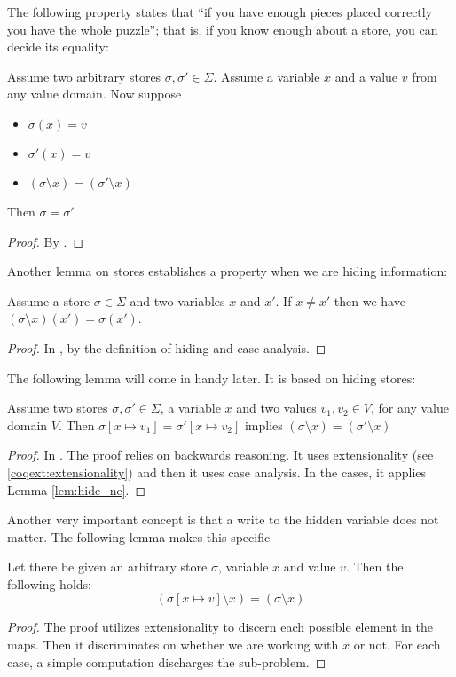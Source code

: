 The following property states that ``if you have enough pieces placed
correctly you have the whole puzzle''; that is, if you know enough about a
store, you can decide its equality:
\begin{lem}
\label{lem:hide-eq}
  Assume two arbitrary stores $\sigma, \sigma' \in \Sigma$. Assume a
  variable $x$ and a value $v$ from any value domain. Now suppose
  \begin{itemize}
  \item $\sigma(x) = v$
  \item $\sigma'(x) = v$
  \item $(\sigma \setminus x) = (\sigma' \setminus x)$
  \end{itemize}
  Then $\sigma = \sigma'$
\end{lem}
\begin{proof}
  By \coq{}.
\end{proof}

Another lemma on stores establishes a property when we are hiding
information:
\begin{lem}
\label{lem:hide_ne}
  Assume a store $\sigma \in \Sigma$ and two variables $x$ and
  $x'$. If $x \neq x'$ then we have $(\sigma \setminus x)(x') = \sigma(x')$.
\end{lem}
\begin{proof}
  In \coq{}, by the definition of hiding and case analysis.
\end{proof}

The following lemma will come in handy later. It is based on hiding
stores:
\begin{lem}
\label{lem:write_hide}
  Assume two stores $\sigma, \sigma' \in \Sigma$, a variable $x$ and
  two values $v_1, v_2 \in V$, for any value domain $V$. Then
  $\sigma[x \mapsto v_1] = \sigma'[x \mapsto v_2]$ implies $(\sigma
  \setminus x) = (\sigma' \setminus x)$
\end{lem}
\begin{proof}
  In \coq{}. The proof relies on backwards reasoning. It uses
  extensionality (see \ref{coqext:extensionality}) and then it uses
  case analysis. In the cases, it applies Lemma \ref{lem:hide_ne}.
\end{proof}

Another very important concept is that a write to the hidden variable
does not matter. The following lemma makes this specific
\begin{lem}
\label{lem:hide-write}
  Let there be given an arbitrary store $\sigma$, variable $x$ and value
  $v$. Then the following holds:
  \begin{equation*}
    (\sigma[x \mapsto v] \setminus x) = (\sigma \setminus x)
  \end{equation*}
\end{lem}
\begin{proof}
  The proof utilizes extensionality to discern each possible element
  in the maps. Then it discriminates on whether we are working with $x$
  or not. For each case, a simple computation discharges the sub-problem.
\end{proof}

